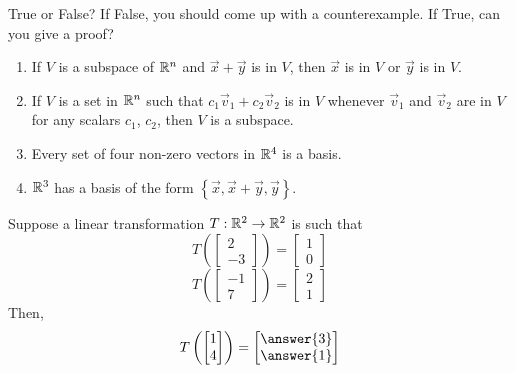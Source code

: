 \documentclass{ximera}
\begin{document}
\begin{exercise}
 
True or False?  If False, you should come up with a counterexample.  If True, can you give a proof?
 
 \begin{enumerate}
     \item If $V$ is a subspace of $\mathbb{R}^n$ and $\vec{x}+\vec{y}$ is in $V$, then $\vec{x}$ is in $V$ or $\vec{y}$ is in $V$.
 
 \begin{multipleChoice}
 \end{multipleChoice}
 
\item If $V$ is a set in $\mathbb{R}^n$ such that $c_1{\vec{v}_1}+c_2{\vec{v}_2}$ is in $V$ whenever ${\vec{v}_1}$ and ${\vec{v}_2}$ are in $V$ for any scalars $c_1$, $c_2$, then $V$ is a subspace.
 
 \begin{multipleChoice}
 \end{multipleChoice}
 
 \item Every set of four non-zero vectors in $\mathbb{R}^4$ is a basis.
 
 \begin{multipleChoice}
 \end{multipleChoice}
 
 \item $\mathbb{R}^3$ has a basis of the form $\left\{\vec{x},\vec{x}+\vec{y},\vec{y}\right\}$.
 
 \begin{multipleChoice}
 \end{multipleChoice}
 \end{enumerate}
 
  
\end{exercise}

\begin{exercise}
Suppose a linear transformation $T:\mathbb{R}^2\rightarrow\mathbb{R}^2$ is such that
$$T\left(\begin{bmatrix}2\\-3\end{bmatrix}\right)=\begin{bmatrix}1\\0\end{bmatrix}$$
$$T\left(\begin{bmatrix}-1\\7\end{bmatrix}\right)=\begin{bmatrix}2\\1\end{bmatrix}$$
Then,
$$T\left(\begin{bmatrix}1\\4\end{bmatrix}\right)=\begin{bmatrix}\answer{3}\\\answer{1}\end{bmatrix}$$
 
 \end{exercise}
\end{document}
